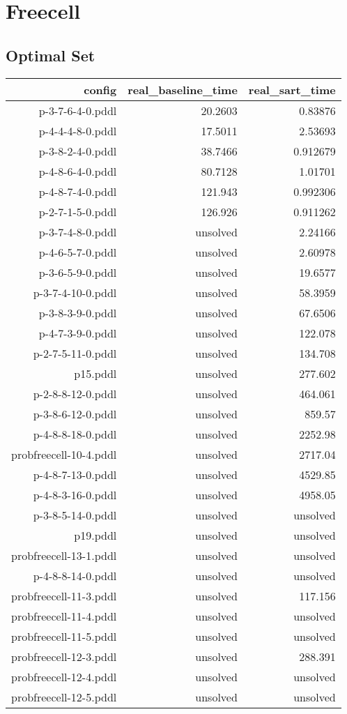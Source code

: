\documentclass{article}
\begin{document}
                    
                \newpage \section{Freecell}
                    \subsection*{Optimal Set}
                    
                            \begin{center}
                            \scriptsize
                            \begin{tabular}{r|r|r}
                            config & real\_baseline\_time & real\_sart\_time\\\midrule
                             p-3-7-6-4-0.pddl&20.2603&0.83876\\
 p-4-4-4-8-0.pddl&17.5011&2.53693\\
 p-3-8-2-4-0.pddl&38.7466&0.912679\\
 p-4-8-6-4-0.pddl&80.7128&1.01701\\
 p-4-8-7-4-0.pddl&121.943&0.992306\\
 p-2-7-1-5-0.pddl&126.926&0.911262\\
 p-3-7-4-8-0.pddl&unsolved&2.24166\\
 p-4-6-5-7-0.pddl&unsolved&2.60978\\
 p-3-6-5-9-0.pddl&unsolved&19.6577\\
 p-3-7-4-10-0.pddl&unsolved&58.3959\\
 p-3-8-3-9-0.pddl&unsolved&67.6506\\
 p-4-7-3-9-0.pddl&unsolved&122.078\\
 p-2-7-5-11-0.pddl&unsolved&134.708\\
 p15.pddl&unsolved&277.602\\
 p-2-8-8-12-0.pddl&unsolved&464.061\\
 p-3-8-6-12-0.pddl&unsolved&859.57\\
 p-4-8-8-18-0.pddl&unsolved&2252.98\\
 probfreecell-10-4.pddl&unsolved&2717.04\\
 p-4-8-7-13-0.pddl&unsolved&4529.85\\
 p-4-8-3-16-0.pddl&unsolved&4958.05\\
 p-3-8-5-14-0.pddl&unsolved&unsolved\\
 p19.pddl&unsolved&unsolved\\
 probfreecell-13-1.pddl&unsolved&unsolved\\
 p-4-8-8-14-0.pddl&unsolved&unsolved\\
 probfreecell-11-3.pddl&unsolved&117.156\\
 probfreecell-11-4.pddl&unsolved&unsolved\\
 probfreecell-11-5.pddl&unsolved&unsolved\\
 probfreecell-12-3.pddl&unsolved&288.391\\
 probfreecell-12-4.pddl&unsolved&unsolved\\
 probfreecell-12-5.pddl&unsolved&unsolved
                            \end{tabular}
                            \end{center}
                    
\end{document}
